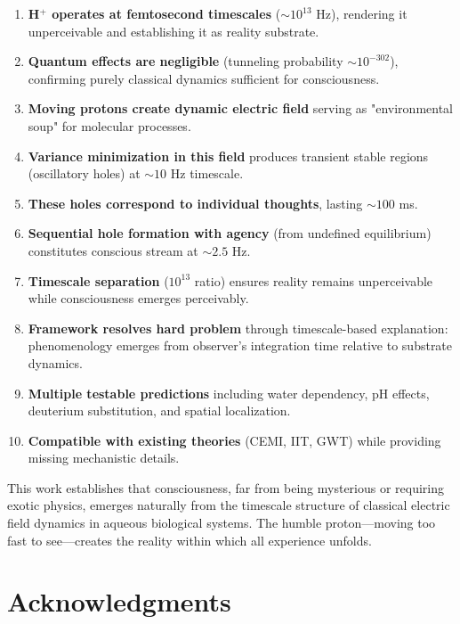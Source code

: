\documentclass[12pt,a4paper]{article}
\begin{document}
\begin{enumerate}
\item \textbf{H$^+$ operates at femtosecond timescales} ($\sim 10^{13}$ Hz), rendering it unperceivable and establishing it as reality substrate.

\item \textbf{Quantum effects are negligible} (tunneling probability $\sim 10^{-302}$), confirming purely classical dynamics sufficient for consciousness.

\item \textbf{Moving protons create dynamic electric field} serving as "environmental soup" for molecular processes.

\item \textbf{Variance minimization in this field} produces transient stable regions (oscillatory holes) at $\sim 10$ Hz timescale.

\item \textbf{These holes correspond to individual thoughts}, lasting $\sim 100$ ms.

\item \textbf{Sequential hole formation with agency} (from undefined equilibrium) constitutes conscious stream at $\sim 2.5$ Hz.

\item \textbf{Timescale separation} ($10^{13}$ ratio) ensures reality remains unperceivable while consciousness emerges perceivably.

\item \textbf{Framework resolves hard problem} through timescale-based explanation: phenomenology emerges from observer's integration time relative to substrate dynamics.

\item \textbf{Multiple testable predictions} including water dependency, pH effects, deuterium substitution, and spatial localization.

\item \textbf{Compatible with existing theories} (CEMI, IIT, GWT) while providing missing mechanistic details.
\end{enumerate}

This work establishes that consciousness, far from being mysterious or requiring exotic physics, emerges naturally from the timescale structure of classical electric field dynamics in aqueous biological systems. The humble proton—moving too fast to see—creates the reality within which all experience unfolds.

\section*{Acknowledgments}
\end{document}
